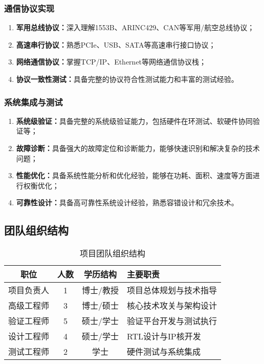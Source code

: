 \documentclass[fontset=windows]{article}
\begin{document}
\subsubsection{通信协议实现}
\begin{enumerate}[label=(\arabic*)]
    \item \textbf{军用总线协议：}深入理解1553B、ARINC429、CAN等军用/航空总线协议；
    \item \textbf{高速串行协议：}熟悉PCIe、USB、SATA等高速串行接口协议；
    \item \textbf{网络通信协议：}掌握TCP/IP、Ethernet等网络通信协议栈；
    \item \textbf{协议一致性测试：}具备完整的协议符合性测试能力和丰富的测试经验。
\end{enumerate}

\subsubsection{系统集成与测试}
\begin{enumerate}[label=(\arabic*)]
    \item \textbf{系统级验证：}具备完整的系统级验证能力，包括硬件在环测试、软硬件协同验证等；
    \item \textbf{故障诊断：}具备强大的故障定位和诊断能力，能够快速识别和解决复杂的技术问题；
    \item \textbf{性能优化：}具备系统性能分析和优化经验，能够在功耗、面积、速度等方面进行权衡优化；
    \item \textbf{可靠性设计：}具备高可靠性系统设计经验，熟悉容错设计和冗余技术。
\end{enumerate}

\subsection{团队组织结构}

\begin{table}[H]
    \centering
    \begin{tabular}{|c|c|c|l|}
        \hline
        职位 & 人数 & 学历结构 & 主要职责 \\
        \hline
        项目负责人 & 1 & 博士/教授 & 项目总体规划与技术指导 \\
        \hline
        高级工程师 & 3 & 博士/硕士 & 核心技术攻关与架构设计 \\
        \hline
        验证工程师 & 5 & 硕士/学士 & 验证平台开发与测试执行 \\
        \hline
        设计工程师 & 4 & 硕士/学士 & RTL设计与IP核开发 \\
        \hline
        测试工程师 & 2 & 学士 & 硬件测试与系统集成 \\
        \hline
    \end{tabular}
    \caption{项目团队组织结构}
    \label{tab:team-structure}
\end{table}
\end{document}
